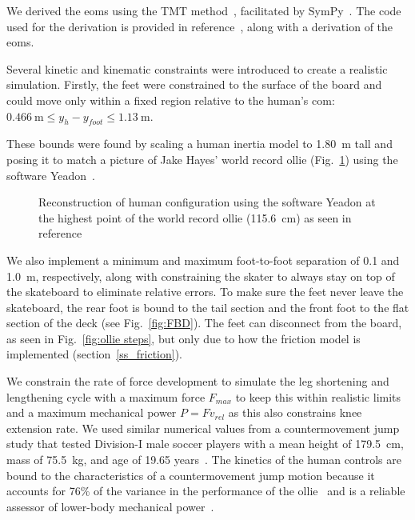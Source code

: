 \documentclass[default,iicol,pdflatex]{sn-jnl}
\begin{document}
We derived the \glspl{eom} using the TMT method~\cite{vallery_heike_advanced_2018}, facilitated by SymPy~\cite{meurer_sympy_2017}.
The code used for the derivation is provided in reference~\cite{heinen_optimal_2022}, along with a derivation of the \glspl{eom}.

Several kinetic and kinematic constraints were introduced to create a realistic simulation. Firstly, the feet were constrained to the surface of the board and could move only within a fixed region relative to the human’s \gls{com}: $\SI{0.466}{\meter} \leq y_h - y_{foot} \leq \SI{1.13}{\meter}$.

These bounds were found by scaling a human inertia model to \SI{1.80}{\meter} tall and posing it to match a picture of Jake Hayes' world record ollie  (Fig.~\ref{fig:f_record}) using the software Yeadon~\cite{Dembia2015}. 

\begin{figure}
    \caption{Reconstruction of human configuration using the software Yeadon at the highest point of the world record ollie (\SI{115.6}{\centi\meter}) as seen in reference~\cite{berrics2018}} 
    \label{fig:f_record}
\end{figure}

We also implement a minimum and maximum foot-to-foot separation of 0.1 and \SI{1.0}{\meter}, respectively, along with constraining the skater to always stay on top of the skateboard to eliminate relative errors.
To make sure the feet never leave the skateboard, the rear foot is bound to the tail section and the front foot to the flat section of the deck (see Fig.~\ref{fig:FBD}).
The feet can disconnect from the board, as seen in Fig.~\ref{fig:ollie steps}, but only due to how the friction model is implemented (section~\ref{ss_friction}).

We constrain the rate of force development to simulate the leg shortening and lengthening cycle with a maximum force $F_{max}$ to keep this within realistic limits and a maximum mechanical power $P = F v_{rel}$ as this also constrains knee extension rate. We used similar numerical values from a countermovement jump study that tested Division-I male soccer players with a mean height of \SI{179.5}{\centi\meter}, mass of \SI{75.5}{\kilo\gram}, and age of 19.65 years~\cite{barker_relationships_2018}. The kinetics of the human controls are bound to the characteristics of a countermovement jump motion because it accounts for 76\% of the variance in the performance of the ollie~\cite{candotti_lower_2012} and is a reliable assessor of lower-body mechanical power~\cite{barker_relationships_2018}. 
\end{document}
